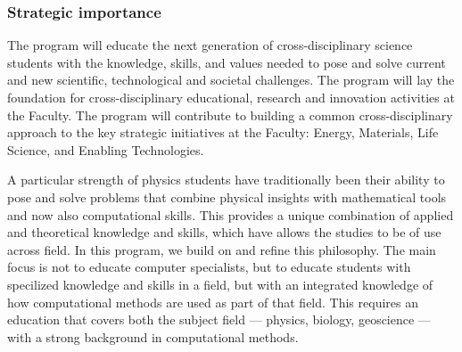 \documentclass{beamer}
\begin{document}
\begin{frame}
\frametitle{Strategic importance}

The program will educate the next generation of cross-disciplinary science students with the knowledge, skills, and values needed to pose and solve current and new scientific, technological and societal challenges. The program will lay the foundation for cross-disciplinary educational, research and innovation activities at the Faculty. The program will contribute to building a common cross-disciplinary approach to the key strategic initiatives at the Faculty: Energy, Materials, Life Science, and Enabling Technologies. 

A particular strength of physics students have traditionally been their ability to pose and solve problems that combine physical insights with mathematical tools and now also computational skills. This provides a unique combination of applied and theoretical knowledge and skills, which have allows the studies to be of use across field. In this program, we build on and refine this philosophy.  The main focus is not to educate computer specialists, but to educate students with specilized knowledge and skills in a field, but with an integrated knowledge of how computational methods are used as part of that field. This requires an education that covers both the subject field --- physics, biology, geoscience --- with a strong background in computational methods.
\end{frame}
\end{document}
